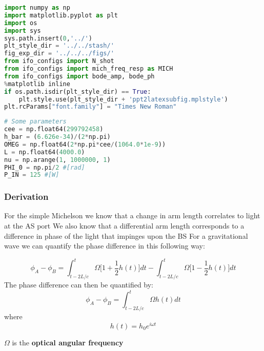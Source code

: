 \begin{spacing}{1.2} \begin{lstlisting}[frame=single, language=Python]
import numpy as np
import matplotlib.pyplot as plt
import os
import sys
sys.path.insert(0,'../')
plt_style_dir = '../../stash/'
fig_exp_dir = '../../../figs/'
from ifo_configs import N_shot
from ifo_configs import mich_freq_resp as MICH
from ifo_configs import bode_amp, bode_ph
%matplotlib inline
if os.path.isdir(plt_style_dir) == True:
    plt.style.use(plt_style_dir + 'ppt2latexsubfig.mplstyle')
plt.rcParams["font.family"] = "Times New Roman"
\end{lstlisting} \end{spacing}

\begin{spacing}{1.2} \begin{lstlisting}[frame=single, language=Python]
# Some parameters
cee = np.float64(299792458)
h_bar = (6.626e-34)/(2*np.pi)
OMEG = np.float64(2*np.pi*cee/(1064.0*1e-9))
L = np.float64(4000.0)
nu = np.arange(1, 1000000, 1)
PHI_0 = np.pi/2 #[rad]
P_IN = 125 #[W]
\end{lstlisting} \end{spacing}

\hypertarget{derivation}{%
\subsubsection{Derivation}\label{derivation}}

For the simple Michelson we know that a change in arm length correlates
to light at the AS port We also know that a differential arm length
corresponds to a difference in phase of the light that impinges upon the
BS For a gravitational wave we can quantify the phase difference in this
following way:

\begin{equation}
\phi_A - \phi_B = \int_{t-2L/c}^{t} \Omega \bigg[1 + \frac{1}{2}h(t)\bigg]dt - \int_{t-2L/c}^{t} \Omega \bigg[1 - \frac{1}{2}h(t)\bigg]dt 
\end{equation} The phase difference can then be quantified by: \begin{equation}
\phi_A - \phi_B = \int_{t-2L/c}^{t} \Omega h(t)dt 
\end{equation} where \begin{equation} 
h(t) = h_0 e^{i \omega t} 
\end{equation}

\noindent \emph{\(\Omega\)} is the \textbf{optical angular frequency}

